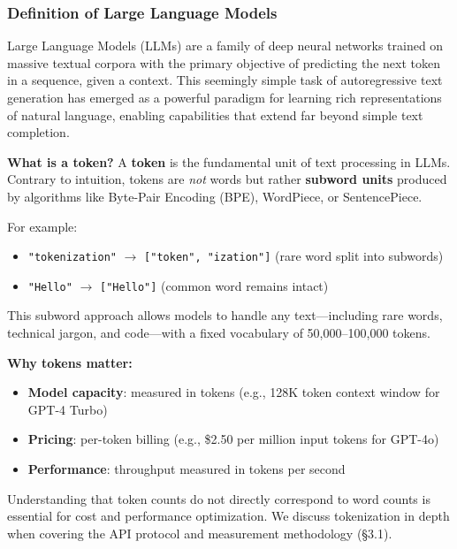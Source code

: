 \documentclass[english]{article}
\begin{document}
\subsubsection{Definition of Large Language Models}

Large Language Models (LLMs) are a family of deep neural networks trained on massive textual corpora with the primary objective of predicting the next token in a sequence, given a context. This seemingly simple task of autoregressive text generation has emerged as a powerful paradigm for learning rich representations of natural language, enabling capabilities that extend far beyond simple text completion.

\medskip

\noindent\textbf{What is a token?}
A \textbf{token} is the fundamental unit of text processing in LLMs. Contrary to intuition, tokens are \emph{not} words but rather \textbf{subword units} produced by algorithms like Byte-Pair Encoding (BPE), WordPiece, or SentencePiece.

For example:
\begin{itemize}
    \item \texttt{"tokenization"} $\rightarrow$ \texttt{["token", "ization"]} (rare word split into subwords)
    \item \texttt{"Hello"} $\rightarrow$ \texttt{["Hello"]} (common word remains intact)
\end{itemize}

\noindent This subword approach allows models to handle any text—including rare words, technical jargon, and code—with a fixed vocabulary of 50,000--100,000 tokens.

\medskip

\noindent\textbf{Why tokens matter:}
\begin{itemize}
    \item \textbf{Model capacity}: measured in tokens (e.g., 128K token context window for GPT-4 Turbo)
    \item \textbf{Pricing}: per-token billing (e.g., \$2.50 per million input tokens for GPT-4o)
    \item \textbf{Performance}: throughput measured in tokens per second
\end{itemize}

\noindent Understanding that token counts do not directly correspond to word counts is essential for cost and performance optimization. We discuss tokenization in depth when covering the API protocol and measurement methodology (§3.1).
\end{document}
